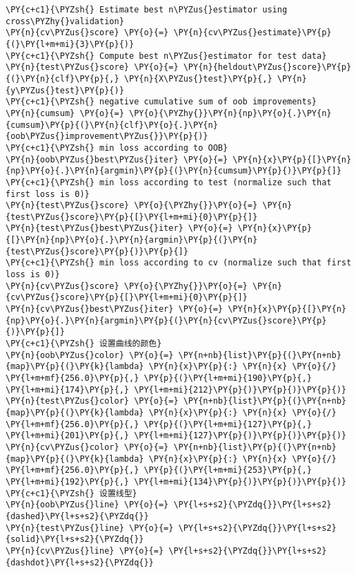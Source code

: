 \begin{Verbatim}[commandchars=\\\{\}]
\PY{c+c1}{\PYZsh{} Estimate best n\PYZus{}estimator using cross\PYZhy{}validation}
\PY{n}{cv\PYZus{}score} \PY{o}{=} \PY{n}{cv\PYZus{}estimate}\PY{p}{(}\PY{l+m+mi}{3}\PY{p}{)}
\PY{c+c1}{\PYZsh{} Compute best n\PYZus{}estimator for test data}
\PY{n}{test\PYZus{}score} \PY{o}{=} \PY{n}{heldout\PYZus{}score}\PY{p}{(}\PY{n}{clf}\PY{p}{,} \PY{n}{X\PYZus{}test}\PY{p}{,} \PY{n}{y\PYZus{}test}\PY{p}{)}
\PY{c+c1}{\PYZsh{} negative cumulative sum of oob improvements}
\PY{n}{cumsum} \PY{o}{=} \PY{o}{\PYZhy{}}\PY{n}{np}\PY{o}{.}\PY{n}{cumsum}\PY{p}{(}\PY{n}{clf}\PY{o}{.}\PY{n}{oob\PYZus{}improvement\PYZus{}}\PY{p}{)}
\PY{c+c1}{\PYZsh{} min loss according to OOB}
\PY{n}{oob\PYZus{}best\PYZus{}iter} \PY{o}{=} \PY{n}{x}\PY{p}{[}\PY{n}{np}\PY{o}{.}\PY{n}{argmin}\PY{p}{(}\PY{n}{cumsum}\PY{p}{)}\PY{p}{]}
\PY{c+c1}{\PYZsh{} min loss according to test (normalize such that first loss is 0)}
\PY{n}{test\PYZus{}score} \PY{o}{\PYZhy{}}\PY{o}{=} \PY{n}{test\PYZus{}score}\PY{p}{[}\PY{l+m+mi}{0}\PY{p}{]}
\PY{n}{test\PYZus{}best\PYZus{}iter} \PY{o}{=} \PY{n}{x}\PY{p}{[}\PY{n}{np}\PY{o}{.}\PY{n}{argmin}\PY{p}{(}\PY{n}{test\PYZus{}score}\PY{p}{)}\PY{p}{]}
\PY{c+c1}{\PYZsh{} min loss according to cv (normalize such that first loss is 0)}
\PY{n}{cv\PYZus{}score} \PY{o}{\PYZhy{}}\PY{o}{=} \PY{n}{cv\PYZus{}score}\PY{p}{[}\PY{l+m+mi}{0}\PY{p}{]}
\PY{n}{cv\PYZus{}best\PYZus{}iter} \PY{o}{=} \PY{n}{x}\PY{p}{[}\PY{n}{np}\PY{o}{.}\PY{n}{argmin}\PY{p}{(}\PY{n}{cv\PYZus{}score}\PY{p}{)}\PY{p}{]}
\PY{c+c1}{\PYZsh{} 设置曲线的颜色}
\PY{n}{oob\PYZus{}color} \PY{o}{=} \PY{n+nb}{list}\PY{p}{(}\PY{n+nb}{map}\PY{p}{(}\PY{k}{lambda} \PY{n}{x}\PY{p}{:} \PY{n}{x} \PY{o}{/} \PY{l+m+mf}{256.0}\PY{p}{,} \PY{p}{(}\PY{l+m+mi}{190}\PY{p}{,} \PY{l+m+mi}{174}\PY{p}{,} \PY{l+m+mi}{212}\PY{p}{)}\PY{p}{)}\PY{p}{)}
\PY{n}{test\PYZus{}color} \PY{o}{=} \PY{n+nb}{list}\PY{p}{(}\PY{n+nb}{map}\PY{p}{(}\PY{k}{lambda} \PY{n}{x}\PY{p}{:} \PY{n}{x} \PY{o}{/} \PY{l+m+mf}{256.0}\PY{p}{,} \PY{p}{(}\PY{l+m+mi}{127}\PY{p}{,} \PY{l+m+mi}{201}\PY{p}{,} \PY{l+m+mi}{127}\PY{p}{)}\PY{p}{)}\PY{p}{)}
\PY{n}{cv\PYZus{}color} \PY{o}{=} \PY{n+nb}{list}\PY{p}{(}\PY{n+nb}{map}\PY{p}{(}\PY{k}{lambda} \PY{n}{x}\PY{p}{:} \PY{n}{x} \PY{o}{/} \PY{l+m+mf}{256.0}\PY{p}{,} \PY{p}{(}\PY{l+m+mi}{253}\PY{p}{,} \PY{l+m+mi}{192}\PY{p}{,} \PY{l+m+mi}{134}\PY{p}{)}\PY{p}{)}\PY{p}{)}
\PY{c+c1}{\PYZsh{} 设置线型}
\PY{n}{oob\PYZus{}line} \PY{o}{=} \PY{l+s+s2}{\PYZdq{}}\PY{l+s+s2}{dashed}\PY{l+s+s2}{\PYZdq{}}
\PY{n}{test\PYZus{}line} \PY{o}{=} \PY{l+s+s2}{\PYZdq{}}\PY{l+s+s2}{solid}\PY{l+s+s2}{\PYZdq{}}
\PY{n}{cv\PYZus{}line} \PY{o}{=} \PY{l+s+s2}{\PYZdq{}}\PY{l+s+s2}{dashdot}\PY{l+s+s2}{\PYZdq{}}

\end{Verbatim}
